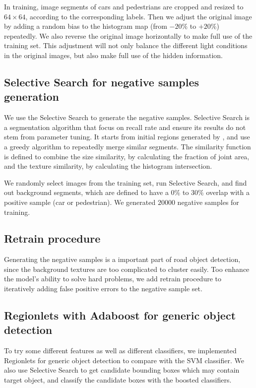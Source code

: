 \documentclass{article} %
\begin{document}
In training, image segments of cars and pedestrians are cropped and resized to $64 \times 64$, according to the corresponding labels. Then we adjust the original image by adding a random bias to the histogram map (from $-20\%$ to $+20\%$) repeatedly. We also reverse the original image horizontally to make full use of the training set. This adjustment will not only balance the different light conditions in the original images, but also make full use of the hidden information. 

\subsection{Selective Search for negative samples generation}

We use the Selective Search \cite{van2011segmentation} to generate the negative samples. Selective Search is a segmentation algorithm that focus on recall rate and ensure its results do not stem from parameter tuning. It starts from initial regions generated by \cite{felzenszwalb2004efficient}, and use a greedy algorithm to repeatedly merge similar segments. The similarity function is defined to combine the size similarity, by calculating the fraction of joint area, and the texture similarity, by calculating the histogram intersection.

We randomly select images from the training set, run Selective Search, and find out background segments, which are defined to have a $0\%$ to $30\%$ overlap with a positive sample (car or pedestrian). We generated $20000$ negative samples for training. 

\subsection{Retrain procedure}

Generating the negative samples is a important part of road object detection, since the background textures are too complicated to cluster easily. Too enhance the model's ability to solve hard problems, we add retrain procedure \cite{felzenszwalb2010object} to iteratively adding false positive errors to the negative sample set.


\subsection{Regionlets with Adaboost for generic object detection}

To try some different features as well as different classifiers, we implemented Regionlets \cite{Wang2013} for generic object detection to compare with the SVM classifier. We also use Selective Search \cite{van2011segmentation} to get candidate bounding boxes which may contain target object, and classify the candidate boxes with the boosted classifiers.
\end{document}
